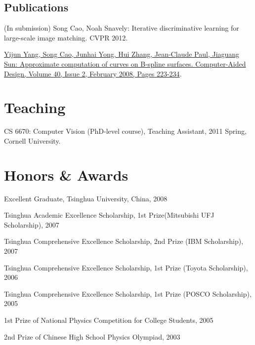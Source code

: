 \documentclass[10pt,letterpaper]{article}
\renewenvironment{itemize}{
  \begin{list}{}{
    \setlength{\leftmargin}{1.5em}
    \setlength{\itemsep}{0.25em}
    \setlength{\parskip}{0pt}
    \setlength{\parsep}{0.25em}
  }
}{
  \end{list}
}
\begin{document}
\subsection*{Publications}
\begin{itemize}
\item (In submission) Song Cao, Noah Snavely: Iterative discriminative learning for large-scale image matching. CVPR 2012.
\item \href{http://dx.doi.org/10.1016/j.cad.2007.10.011}{Yijun Yang, Song Cao, Junhai Yong, Hui Zhang, Jean-Claude Paul, Jiaguang Sun: Approximate computation of curves on B-spline surfaces. Computer-Aided Design, Volume 40, Issue 2, February 2008, Pages 223-234}.
\end{itemize}

\section*{Teaching}
\begin{itemize}
    \item CS 6670: Computer Vision (PhD-level course), Teaching Assistant, 2011 Spring, Cornell University.
\end{itemize}

\section*{Honors \& Awards}
\begin{itemize}
\item Excellent Graduate, Tsinghua University, China, 2008
\item Tsinghua Academic Excellence Scholarship, 1st Prize(Mitsubishi UFJ Scholarship), 2007
\item Tsinghua Comprehensive Excellence Scholarship, 2nd Prize (IBM Scholarship), 2007
\item Tsinghua Comprehensive Excellence Scholarship, 1st Prize (Toyota Scholarship), 2006
\item Tsinghua Comprehensive Excellence Scholarship, 1st Prize (POSCO Scholarship), 2005
\item 1st Prize of National Physics Competition for College Students, 2005
\item 2nd Prize of Chinese High School Physics Olympiad, 2003
\end{itemize}
\end{document}
